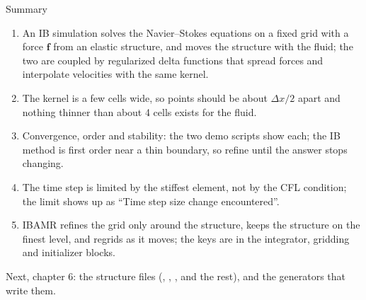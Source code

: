 \documentclass[aspectratio=169,11pt]{beamer}
\begin{document}
\begin{frame}{Summary}
\begin{enumerate}
  \item An IB simulation solves the Navier--Stokes equations on a fixed grid with a force $\mathbf{f}$ from an elastic structure, and moves the structure with the fluid; the two are coupled by regularized delta functions that spread forces and interpolate velocities with the same kernel.
  \item The kernel is a few cells wide, so points should be about $\Delta x/2$ apart and nothing thinner than about 4 cells exists for the fluid.
  \item Convergence, order and stability: the two demo scripts show each; the IB method is first order near a thin boundary, so refine until the answer stops changing.
  \item The time step is limited by the stiffest element, not by the CFL condition; the limit shows up as ``Time step size change encountered''.
  \item IBAMR refines the grid only around the structure, keeps the structure on the finest level, and regrids as it moves; the keys are in the integrator, gridding and initializer blocks.
\end{enumerate}
\vspace{2mm}
\begin{homebox}
\small Next, chapter 6: the structure files (, , ,  and the rest), and the generators that write them.
\end{homebox}
\end{frame}
\end{document}
